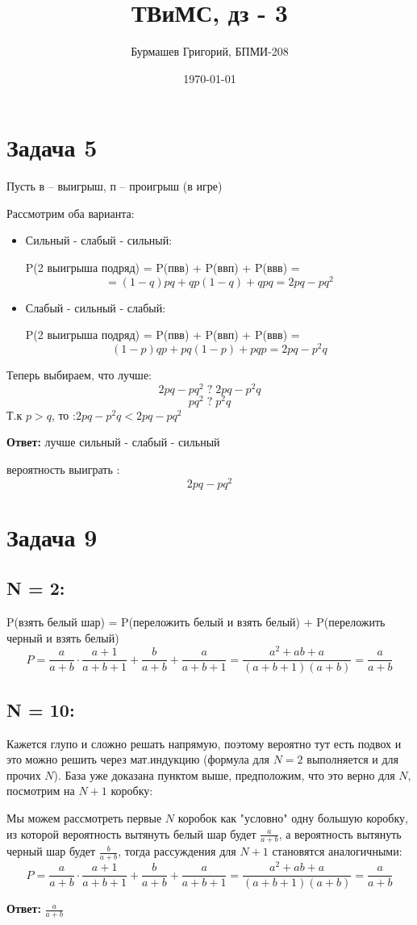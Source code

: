 \documentclass[a4paper,12pt]{article}
\author{Бурмашев Григорий, БПМИ-208}
\title{ТВиМС, дз - 3}
\date{\today}
\begin{document}
\maketitle
\clearpage
\section*{Задача 5}
\begin{center}
Пусть в -- выигрыш, п -- проигрыш (в игре) 
\end{center}
Рассмотрим оба варианта:
\begin{itemize}
\item Сильный - слабый - сильный:

P(2 выигрыша подряд) = P(пвв) + P(ввп) + P(ввв) = 
\[
= (1 - q)pq + qp(1-q) + qpq = 2pq - pq^2
\]

\item Слабый - сильный - слабый:

P(2 выигрыша подряд) =  P(пвв) + P(ввп) + P(ввв) = 
\[
(1 - p)qp + pq(1 - p) + pqp = 2pq - p^2 q
\]
\end{itemize}
Теперь выбираем, что лучше:
\[
2pq - pq^2   \; ? \; 2pq - p^2q
\]
\[
pq^2 \; ? \; p^2q
\]
Т.к $p > q$, то :$2pq - p^2q < 2pq - pq^2$
\begin{center}
\textbf{Ответ: } лучше сильный - слабый - сильный

вероятность выиграть :
\[
2pq - pq^2
\]
\end{center}
\clearpage
\section*{Задача 9}
\subsection*{N = 2:}
P(взять белый шар) = P(переложить белый и взять белый) + P(переложить черный и взять белый)
\[
P = \frac{a}{a + b} \cdot \frac{a + 1}{a + b + 1} + \frac{b}{a + b} + \frac{a}{a + b + 1 } = \frac{a^2 + ab + a}{(a +b + 1)(a + b)} = \frac{a}{a + b}
\]
\subsection*{N = 10: }
Кажется глупо и сложно решать напрямую, поэтому вероятно тут есть подвох и это можно решить через мат.индукцию (формула для $N = 2$ выполняется и для прочих $N$). База уже доказана пунктом выше, предположим, что это верно для $N$, посмотрим на $N + 1$ коробку:

Мы можем рассмотреть первые $N$ коробок как "условно" \; одну большую коробку, из которой вероятность вытянуть белый шар будет $\frac{a}{a+b}$, а вероятность вытянуть черный шар будет $\frac{b}{a + b}$, тогда рассуждения для $N + 1$ становятся аналогичными:
\[
P = \frac{a}{a + b} \cdot \frac{a + 1}{a + b + 1} + \frac{b}{a + b} + \frac{a}{a + b + 1 } = \frac{a^2 + ab + a}{(a +b + 1)(a + b)} = \frac{a}{a + b}
\]
\begin{center}
\textbf{Ответ: } $\frac{a}{a + b}$
\end{center}
\clearpage
\end{document}
